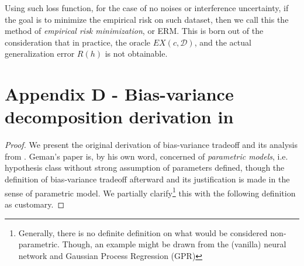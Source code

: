 \documentclass[
  journal=largetwo,
  year=2025,
  volume=37,
]{cup-journal}
\begin{document}
Using such loss function, for the case of no noises or interference uncertainty, if the goal is to minimize the empirical risk on such dataset, then we call this the method of \textit{empirical risk minimization}, or ERM. This is born out of the consideration that in practice, the oracle $EX(c,\mathcal{D})$, and the actual generalization error $R(h)$ is not obtainable. 
\section*{Appendix D - Bias-variance decomposition derivation in \cite{6797087}}

\begin{proof}
    We present the original derivation of bias-variance tradeoff and its analysis from \cite{6797087}. Geman's paper is, by his own word, concerned of \textit{parametric models}, i.e. hypothesis class without strong assumption of parameters defined, though the definition of bias-variance tradeoff afterward and its justification is made in the sense of parametric model. We partially clarify\footnote{Generally, there is no definite definition on what would be considered non-parametric. Though, an example might be drawn from the (vanilla) neural network and Gaussian Process Regression (GPR)} this with the following definition as customary. 


\end{proof}
\end{document}
